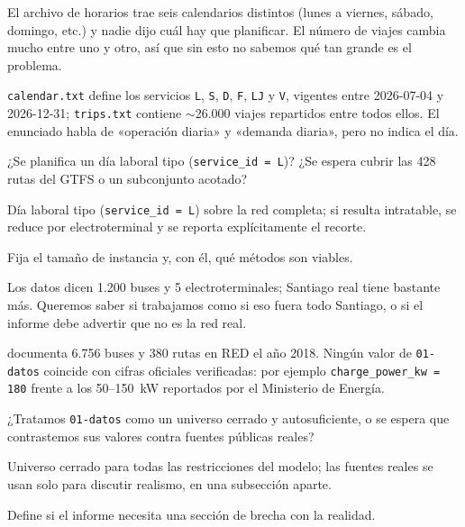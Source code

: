 \documentclass[11pt,a4paper,parskip=half]{scrartcl}
\begin{document}
\begin{campos}
\item[En simple] El archivo de horarios trae seis calendarios distintos (lunes a viernes, sábado, domingo, etc.) y nadie dijo cuál hay que planificar. El número de viajes cambia mucho entre uno y otro, así que sin esto no sabemos qué tan grande es el problema.
\item[Evidencia] \texttt{calendar.txt} define los servicios \texttt{L}, \texttt{S}, \texttt{D}, \texttt{F}, \texttt{LJ} y \texttt{V}, vigentes entre 2026-07-04 y 2026-12-31; \texttt{trips.txt} contiene $\sim$26.000 viajes repartidos entre todos ellos. El enunciado habla de «operación diaria» y «demanda diaria», pero no indica el día.
\item[Pregunta] ¿Se planifica un día laboral tipo (\texttt{service\_id = L})? ¿Se espera cubrir las 428 rutas del GTFS o un subconjunto acotado?
\item[Supuesto] Día laboral tipo (\texttt{service\_id = L}) sobre la red completa; si resulta intratable, se reduce por electroterminal y se reporta explícitamente el recorte.
\item[Impacto] Fija el tamaño de instancia y, con él, qué métodos son viables.
\end{campos}

\begin{campos}
\item[En simple] Los datos dicen 1.200 buses y 5 electroterminales; Santiago real tiene bastante más. Queremos saber si trabajamos como si eso fuera todo Santiago, o si el informe debe advertir que no es la red real.
\item[Evidencia] \citet{galarza_pilotstoscale_2020} documenta 6.756 buses y 380 rutas en RED el año 2018. Ningún valor de \texttt{01-datos} coincide con cifras oficiales verificadas: por ejemplo \texttt{charge\_power\_kw = 180} frente a los 50--150~kW reportados por el Ministerio de Energía.
\item[Pregunta] ¿Tratamos \texttt{01-datos} como un universo cerrado y autosuficiente, o se espera que contrastemos sus valores contra fuentes públicas reales?
\item[Supuesto] Universo cerrado para todas las restricciones del modelo; las fuentes reales se usan solo para discutir realismo, en una subsección aparte.
\item[Impacto] Define si el informe necesita una sección de brecha con la realidad.
\end{campos}
\end{document}
